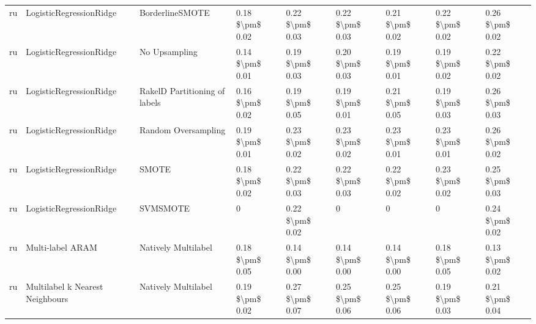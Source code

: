 \begin{tabular}{lllllllll}
      ru &         LogisticRegressionRidge &               BorderlineSMOTE &     0.18 \$\textbackslash pm\$ 0.02 &           0.22 \$\textbackslash pm\$ 0.03 &       0.22 \$\textbackslash pm\$ 0.03 &        0.21 \$\textbackslash pm\$ 0.02 &                         0.22 \$\textbackslash pm\$ 0.02 &     0.26 \$\textbackslash pm\$ 0.02 \\
      ru &         LogisticRegressionRidge &                 No Upsampling &     0.14 \$\textbackslash pm\$ 0.01 &           0.19 \$\textbackslash pm\$ 0.03 &       0.20 \$\textbackslash pm\$ 0.03 &        0.19 \$\textbackslash pm\$ 0.01 &                         0.19 \$\textbackslash pm\$ 0.02 &     0.22 \$\textbackslash pm\$ 0.02 \\
      ru &         LogisticRegressionRidge & RakelD Partitioning of labels &     0.16 \$\textbackslash pm\$ 0.02 &           0.19 \$\textbackslash pm\$ 0.05 &       0.19 \$\textbackslash pm\$ 0.01 &        0.21 \$\textbackslash pm\$ 0.05 &                         0.19 \$\textbackslash pm\$ 0.03 &     0.26 \$\textbackslash pm\$ 0.03 \\
      ru &         LogisticRegressionRidge &           Random Oversampling &     0.19 \$\textbackslash pm\$ 0.01 &           0.23 \$\textbackslash pm\$ 0.02 &       0.23 \$\textbackslash pm\$ 0.02 &        0.23 \$\textbackslash pm\$ 0.01 &                         0.23 \$\textbackslash pm\$ 0.01 &     0.26 \$\textbackslash pm\$ 0.02 \\
      ru &         LogisticRegressionRidge &                         SMOTE &     0.18 \$\textbackslash pm\$ 0.02 &           0.22 \$\textbackslash pm\$ 0.03 &       0.22 \$\textbackslash pm\$ 0.03 &        0.22 \$\textbackslash pm\$ 0.02 &                         0.23 \$\textbackslash pm\$ 0.02 &     0.25 \$\textbackslash pm\$ 0.03 \\
      ru &         LogisticRegressionRidge &                      SVMSMOTE &                   0 &           0.22 \$\textbackslash pm\$ 0.02 &                     0 &                      0 &                                       0 &     0.24 \$\textbackslash pm\$ 0.02 \\
      ru &                Multi-label ARAM &           Natively Multilabel &     0.18 \$\textbackslash pm\$ 0.05 &           0.14 \$\textbackslash pm\$ 0.00 &       0.14 \$\textbackslash pm\$ 0.00 &        0.14 \$\textbackslash pm\$ 0.00 &                         0.18 \$\textbackslash pm\$ 0.05 &     0.13 \$\textbackslash pm\$ 0.02 \\
      ru & Multilabel k Nearest Neighbours &           Natively Multilabel &     0.19 \$\textbackslash pm\$ 0.02 &           0.27 \$\textbackslash pm\$ 0.07 &       0.25 \$\textbackslash pm\$ 0.06 &        0.25 \$\textbackslash pm\$ 0.06 &                         0.19 \$\textbackslash pm\$ 0.03 &     0.21 \$\textbackslash pm\$ 0.04 \\

\end{tabular}
